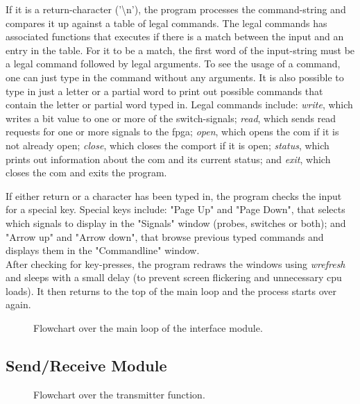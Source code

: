 \documentclass[main.tex]{subfiles}
\begin{document}
If it is a return-character ('\textbackslash n'), the program processes the command-string and compares it up against a table of legal commands. The legal commands has associated functions that executes if there is a match between the input and an entry in the table. For it to be a match, the first word of the input-string must be a legal command followed by legal arguments. To see the usage of a command, one can just type in the command without any arguments. It is also possible to type in just a letter or a partial word to print out possible commands that contain the letter or partial word typed in. Legal commands include: \textit{write}, which writes a bit value to one or more of the switch-signals; \textit{read}, which sends read requests for one or more signals to the \gls{fpga}; \textit{open}, which opens the \gls{com} if it is not already open; \textit{close}, which closes the comport if it is open; \textit{status}, which prints out information about the \gls{com} and its current status; and \textit{exit}, which closes the \gls{com} and exits the program.

If either return or a character has been typed in, the program checks the input for a special key. Special keys include: "Page Up" and "Page Down", that selects which signals to display in the "Signals" window (probes, switches or both); and "Arrow up" and "Arrow down", that browse previous typed commands and displays them in the "Commandline" window.\\

After checking for key-presses, the program redraws the windows using \textit{wrefresh} and sleeps with a small delay (to prevent screen flickering and unnecessary cpu loads). It then returns to the top of the main loop and the process starts over again. 

\begin{figure}[H] %
\begin{center}

\caption{Flowchart over the main loop of the interface module.}
\label{fig:flowgui}
\end{center}
\end{figure}

\subsection{Send/Receive Module}

\begin{figure}[H] %
\begin{center}

\caption{Flowchart over the transmitter function.}
\label{fig:flowtx}
\end{center}
\end{figure}
\end{document}
